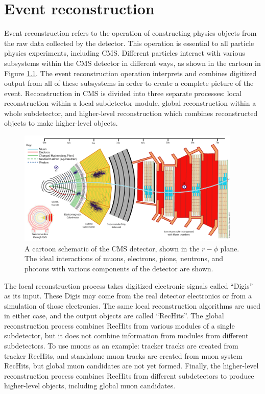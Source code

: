 \chapter{Event reconstruction}
\label{ch:reco}

Event reconstruction refers to the operation
of constructing physics objects from the raw data collected by
the detector.  This operation is essential to all particle physics
experiments, including CMS.  Different particles interact with various subsystems within the
CMS detector in different ways, as shown in the cartoon in Figure 
\ref{fig:reco}.  The event reconstruction operation interprets and combines digitized output from all of these subsystems
in order to create a complete picture of the event.
Reconstruction in CMS is divided into three separate processes: local reconstruction within
a local subdetector module, global reconstruction within a whole subdetector,
and higher-level reconstruction which combines reconstructed objects to make
higher-level objects.

\begin{figure}
  \centering
  \includegraphics[width=0.95\textwidth]{tex/reco/fig/reco-cms.png}
  \caption{A cartoon schematic of the CMS detector, shown in the $r-\phi$ plane.
    The ideal interactions of muons, electrons, pions, neutrons, and photons 
    with various components of the detector are shown.
  }
  \label{fig:reco}
\end{figure}

The local reconstruction process takes digitized electronic 
signals called ``Digis'' as its input.  These Digis may
come from the real detector electronics or from a simulation
of those electronics.  The same local reconstruction algorithms
are used in either case, and the output objects are called ``RecHits''.
The global reconstruction process combines RecHits from various
modules of a single subdetector, but it does not combine information
from modules from different subdetectors.  To use muons as an example:
tracker tracks are created from tracker RecHits, and standalone
muon tracks are created from muon system RecHits, but global muon candidates
are not yet formed.
Finally, the higher-level reconstruction process combines RecHits from 
different subdetectors to produce higher-level objects, including
global muon candidates.  

